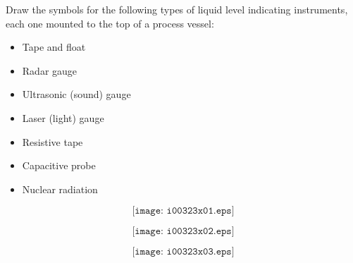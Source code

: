 

Draw the symbols for the following types of liquid level indicating instruments, each one mounted to the top of a process vessel:

\begin{itemize}
\item{} Tape and float
\item{} Radar gauge
\item{} Ultrasonic (sound) gauge
\item{} Laser (light) gauge
\item{} Resistive tape
\item{} Capacitive probe
\item{} Nuclear radiation
\end{itemize}







$$\texttt{[image: i00323x01.eps]}$$

$$\texttt{[image: i00323x02.eps]}$$

$$\texttt{[image: i00323x03.eps]}$$











